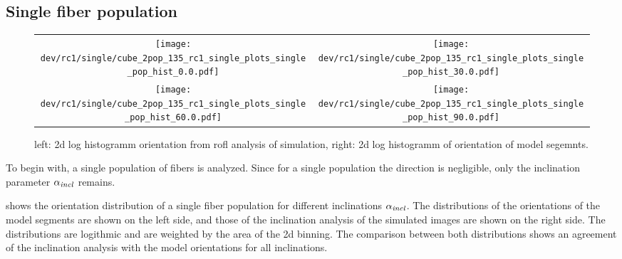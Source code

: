 \subsection{Single fiber population}
% 
\begin{figure}[!tp]
\centering
\newlength{\width}
\setlength{\width}{0.45\textwidth}
\begin{tabular}{c|c}
    \texttt{[image: dev/rc1/single/cube\_2pop\_135\_rc1\_single\_plots\_single\_pop\_hist\_0.0.pdf]}&
    \texttt{[image: dev/rc1/single/cube\_2pop\_135\_rc1\_single\_plots\_single\_pop\_hist\_30.0.pdf]}\\ 
    \texttt{[image: dev/rc1/single/cube\_2pop\_135\_rc1\_single\_plots\_single\_pop\_hist\_60.0.pdf]}&
    \texttt{[image: dev/rc1/single/cube\_2pop\_135\_rc1\_single\_plots\_single\_pop\_hist\_90.0.pdf]}
\end{tabular}
% 
\caption[sim]{left: 2d log histogramm orientation from rofl analysis of simulation, right: 2d log histogramm of orientation of model segemnts. }
\label{fig:single_fiber_pop_hist}
\end{figure}
% 
To begin with, a single population of fibers is analyzed.
Since for a single population the direction is negligible, only the inclination parameter $\textnormal{$\alpha_{\mathit{incl}}$}{}$ remains.
\par
% 
 shows the orientation distribution of a single fiber population for different inclinations $\textnormal{$\alpha_{\mathit{incl}}$}{}$.
The distributions of the orientations of the model segments are shown on the left side, and those of the inclination analysis of the simulated images are shown on the right side.
The distributions are logithmic and are weighted by the area of the 2d binning.
The comparison between both distributions shows an agreement of the inclination analysis with the model orientations for all inclinations.
\par
% 
% 
% 
